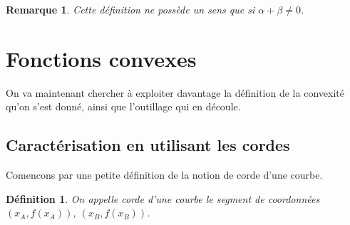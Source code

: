 \documentclass[12pt,a4paper,french]{article}
\theoremstyle{break}
\newtheorem{definition}{Définition}
\theoremstyle{plain}
\theoremstyle{nonumberplain}
\newtheorem{remarque}{Remarque}
\theoremstyle{nonumberbreak}
\begin{document}
\begin{remarque}
  Cette définition ne possède un sens que si $\alpha + \beta \neq 0$.
\end{remarque}

\section{Fonctions convexes}

On va maintenant chercher à exploiter davantage la définition de la
convexité qu'on s'est donné, ainsi que l'outillage qui en découle.

\subsection{Caractérisation en utilisant les cordes}

Comencons par une petite définition de la notion de corde d'une courbe.

\begin{definition}
  On appelle corde d'une courbe le segment de coordonnées
  $(x_A,f(x_A))$, $(x_B,f(x_B))$.
\end{definition}

\begin{center}
\end{center}
\end{document}
